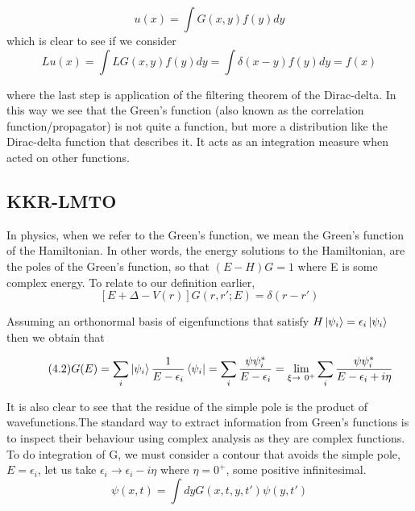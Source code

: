 \documentclass[12pt]{article}
\begin{document}
$$u(x)=\int G(x,y)f(y)dy$$
which is clear to see if we consider 
$$Lu(x)=\int LG(x,y)f(y)dy=\int \delta(x-y)f(y)dy =f(x)$$

where the last step is application of the filtering theorem of the Dirac-delta. In this way we see that the Green's function (also known as the correlation function/propagator) is not quite a function, but more a distribution like the Dirac-delta function that describes it. It acts as an integration measure when acted on other functions.

\subsection{KKR-LMTO}

In physics, when we refer to the Green's function, we mean the Green's function of the Hamiltonian. In other words, the energy solutions to the Hamiltonian, are the poles of the Green's function, so that $(E-H)G=1$ where E is some complex energy. To relate to our definition earlier,
\begin{equation} \label{4.1} \tag{4.1}
[E+\Delta -V(r)]G(r,r';E)=\delta (r-r')
\end{equation}

Assuming an orthonormal basis of eigenfunctions that satisfy $H\ket{\psi_i}=\epsilon_i \ket{\psi_i}$ then we obtain that 

\begin{equation} \label{4.1} \tag{4.2}
G(E) = \sum_i \ket{\psi_i} \frac{1}{E-\epsilon_i} \bra{\psi_i}=\sum_i \frac{\psi \psi_i^*}{E-\epsilon_i}=\lim_{\xi\to\ 0^+} \sum_i \frac{\psi \psi_i^*}{E-\epsilon_i+i\eta}
\end{equation}


It is also clear to see that the residue of the simple pole is the product of wavefunctions.The standard way to extract information from Green's functions is to inspect their behaviour using complex analysis as they are complex functions. To do integration of G, we must consider a contour that avoids the simple pole, $E=\epsilon_i$, let us take $\epsilon_i \rightarrow \epsilon_i-i\eta$ where $\eta=0^+$, some positive infinitesimal.
\begin{equation} \label{4.1} \tag{4.3}
\psi(x,t)=\int dy G(x,t,y,t')\psi(y,t')
\end{equation}
\end{document}
